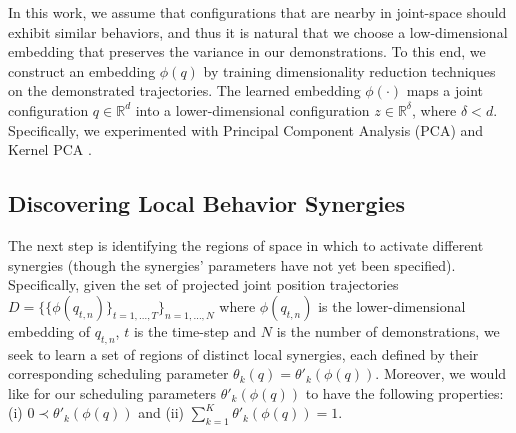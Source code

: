 \documentclass[letterpaper, 10 pt, conference,fleqn]{ieeeconf}
\begin{document}
In this work, we assume that configurations that are nearby in joint-space should exhibit similar behaviors, and thus it is natural that we choose a low-dimensional embedding that preserves the variance in our demonstrations. To this end, we construct an embedding $\phi(q)$ by training dimensionality reduction techniques on the demonstrated trajectories. The learned embedding $\phi(\cdot)$ maps a joint configuration $q \in \mathbb{R}^d$ into a lower-dimensional configuration $z \in \mathbb{R}^\delta$, where $\delta < d$. Specifically, we experimented with Principal Component Analysis (PCA) and Kernel PCA \cite{scholkopf1997kernel}. 

\nocite{*}

\subsection{Discovering Local Behavior Synergies}
The next step is identifying the regions of space in which to activate different synergies (though the synergies' parameters have not yet been specified). Specifically, given the set of projected joint position trajectories $D=\{\{\phi(q_{t,n})\}_{t=1,\dots, T}\}_{n=1,\dots,N}$ where $\phi(q_{t,n})$ is the lower-dimensional embedding of $q_{t,n}$, $t$ is the time-step and $N$ is the number of demonstrations, we seek to learn a set of regions of distinct local synergies, each defined by their corresponding scheduling parameter $\theta_k(q) = \theta'_k(\phi(q))$. Moreover, we would like for our scheduling parameters $\theta'_k(\phi(q))$ to have the following properties: (i) $0 \prec \theta'_k(\phi(q))$ and (ii) $\sum_{k=1}^{K}\theta'_k(\phi(q)) = 1$.
 
\end{document}
